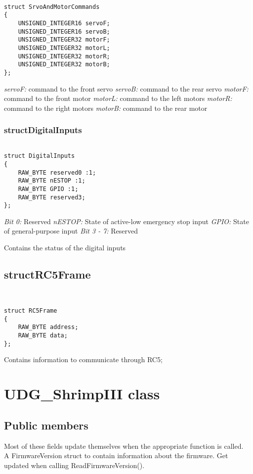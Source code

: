 \documentclass{book}
\begin{document}
\begin{lstlisting}

struct SrvoAndMotorCommands 
{
	UNSIGNED_INTEGER16 servoF;
	UNSIGNED_INTEGER16 servoB;
	UNSIGNED_INTEGER32 motorF;
	UNSIGNED_INTEGER32 motorL;
	UNSIGNED_INTEGER32 motorR;
	UNSIGNED_INTEGER32 motorB;
};
\end{lstlisting}

\textit{servoF:} command to the front servo
\textit{servoB:} command to the rear servo
\textit{motorF:} command to the front motor
\textit{motorL:} command to the left motors
\textit{motorR:} command to the right motors
\textit{motorB:} command to the rear motor

\subsubsection{structDigitalInputs}
 \begin{lstlisting}

struct DigitalInputs
{
	RAW_BYTE reserved0 :1;
	RAW_BYTE nESTOP :1;
	RAW_BYTE GPIO :1;
	RAW_BYTE reserved3;
};
 \end{lstlisting}
 
 \textit{Bit 0:}	Reserved
 \textit{nESTOP:}		State of active-low emergency stop input
 \textit{GPIO:}		State of general-purpose input
 \textit{Bit 3 - 7:}	Reserved
    
Contains the status of the digital inputs 

\subsection{structRC5Frame}

\begin{lstlisting}


struct RC5Frame
{
	RAW_BYTE address;
	RAW_BYTE data;
};
 \end{lstlisting}
 
 Contains information to communicate through RC5;

\section{UDG\_ShrimpIII class}

\subsection{Public members}
Most of these fields update themselves when the appropriate function is called.\\
A FirmwareVersion struct to contain information about the firmware. Get updated when calling ReadFirmwareVersion().\\
\end{document}
